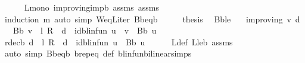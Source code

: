 \begin{isabellebody}
\ \ \ \ \isamarkupfalse%
\ L{\isacharunderscore}{\kern0pt}mono\ {\isasymnu}{\isacharunderscore}{\kern0pt}improving{\isacharunderscore}{\kern0pt}imp{\isacharunderscore}{\kern0pt}{\isasymL}\isactrlsub b\ assms{\isacharparenleft}{\kern0pt}{}{\isacharparenright}{\kern0pt}\ assms\ \isanewline
\ \ \ \ \isamarkupfalse%
\ {\isacharparenleft}{\kern0pt}induction\ m{\isacharparenright}{\kern0pt}\ {\isacharparenleft}{\kern0pt}auto\ simp{\isacharcolon}{\kern0pt}\ W{\isacharunderscore}{\kern0pt}eq{\isacharunderscore}{\kern0pt}L{\isacharunderscore}{\kern0pt}iter\ B\isactrlsub b{\isacharunderscore}{\kern0pt}eq{\isacharunderscore}{\kern0pt}{\isasymL}\isactrlsub b{\isacharparenright}{\kern0pt}\isanewline
\ \ \isamarkupfalse%
\ \isamarkupfalse%
\ {\isacharquery}{\kern0pt}thesis\ \isacommand{{\isachardot}{\kern0pt}}\isamarkupfalse%
\isanewline
{}\isamarkupfalse%
%
\endisatagproof
{\isafoldproof}%
%
\isadelimproof
\isanewline
%
\endisadelimproof
\isanewline
{}\isamarkupfalse%
\ B\isactrlsub b{\isacharunderscore}{\kern0pt}le{\isacharcolon}{\kern0pt}\isanewline
\ \ \ {\isachardoublequoteopen}{\isasymnu}{\isacharunderscore}{\kern0pt}improving\ v\ d{\isachardoublequoteclose}\isanewline
\ \ \ {\isachardoublequoteopen}B\isactrlsub b\ v\ {\isacharplus}{\kern0pt}\ {\isacharparenleft}{\kern0pt}l\ {\isacharasterisk}{\kern0pt}\isactrlsub R\ {\isasymP}\ d\ {\isacharminus}{\kern0pt}\ id{\isacharunderscore}{\kern0pt}blinfun{\isacharparenright}{\kern0pt}\ {\isacharparenleft}{\kern0pt}u\ {\isacharminus}{\kern0pt}\ v{\isacharparenright}{\kern0pt}\ {\isasymle}\ B\isactrlsub b\ u{\isachardoublequoteclose}\isanewline
%
\isadelimproof
%
\endisadelimproof
%
\isatagproof
{}\isamarkupfalse%
\ {\isacharminus}{\kern0pt}\isanewline
\ \ \isamarkupfalse%
\ {\isachardoublequoteopen}r{\isacharunderscore}{\kern0pt}dec\isactrlsub b\ d\ {\isacharplus}{\kern0pt}\ {\isacharparenleft}{\kern0pt}l\ {\isacharasterisk}{\kern0pt}\isactrlsub R\ {\isasymP}\ d\ {\isacharminus}{\kern0pt}\ id{\isacharunderscore}{\kern0pt}blinfun{\isacharparenright}{\kern0pt}\ u\ {\isasymle}\ B\isactrlsub b\ u{\isachardoublequoteclose}\isanewline
\ \ \ \ \isamarkupfalse%
\ L{\isacharunderscore}{\kern0pt}def\ L{\isacharunderscore}{\kern0pt}le{\isacharunderscore}{\kern0pt}{\isasymL}\isactrlsub b\ assms\ \ \ \ \ \isanewline
\ \ \ \ \isamarkupfalse%
\ {\isacharparenleft}{\kern0pt}auto\ simp{\isacharcolon}{\kern0pt}\ B\isactrlsub b{\isacharunderscore}{\kern0pt}eq{\isacharunderscore}{\kern0pt}{\isasymL}\isactrlsub b\ {\isasymL}\isactrlsub b{\isachardot}{\kern0pt}rep{\isacharunderscore}{\kern0pt}eq\ {\isasymL}{\isacharunderscore}{\kern0pt}def\ blinfun{\isachardot}{\kern0pt}bilinear{\isacharunderscore}{\kern0pt}simps{\isacharparenright}{\kern0pt}\isanewline

\end{isabellebody}
